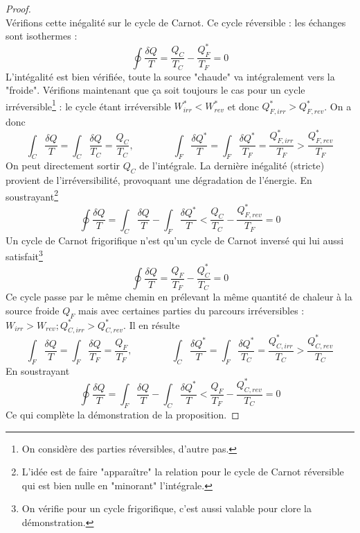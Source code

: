 	\begin{proof}\ \\
	Vérifions cette inégalité sur le cycle de Carnot. Ce cycle réversible : les 
	échanges sont isothermes :
	\begin{equation}
	\oint \dfrac{\delta Q}{T} = \dfrac{Q_C}{T_C} - \dfrac{Q_F^*}{T_F} = 0
	\end{equation}
	L'intégalité est bien vérifiée, toute la source "chaude" va intégralement vers 
	la "froide". Vérifions maintenant que ça soit toujours le 
	cas pour un cycle irréversible\footnote{On considère des parties réversibles, 
	d'autre pas.} : le cycle étant irréversible $W_{irr}^* < W_{rev}^*$ et donc 
	$Q_{F,irr}^* > Q_{F,rev}^*$. On a donc 
	\begin{equation}
	\int_C \dfrac{\delta Q}{T} = \int_C \dfrac{\delta Q}{T_C} = \dfrac{Q_C}{T_C}, 
	\qquad\qquad
	\int_F \dfrac{\delta Q^*}{T} = \int_F \dfrac{\delta Q^*}{T_F} = \dfrac{Q_{F,irr}^*}{T_F} 
	> \dfrac{Q_{F,rev}^*}{T_F} 
	\end{equation}
	On peut directement sortir $Q_C$ de l'intégrale. La dernière inégalité (stricte) 
	provient de l'irréversibilité, provoquant une dégradation de l'énergie. En 
	soustrayant\footnote{L'idée est de faire "apparaître" la relation pour le cycle 
	de Carnot réversible qui est bien nulle en "minorant" l'intégrale.}
	\begin{equation}
	\oint \dfrac{\delta Q}{T} = \int_C \dfrac{\delta Q}{T}-\int_F\dfrac{\delta Q^*}{T} 
	< \dfrac{Q_C}{T_C}-\dfrac{Q_{F,rev}^*}{T_F} = 0
	\end{equation}
	Un cycle de Carnot frigorifique n'est qu'un cycle de Carnot inversé qui lui 
	aussi satisfait\footnote{On vérifie pour un cycle frigorifique, c'est 
	aussi valable pour clore la démonstration.}
	\begin{equation}
	\oint \dfrac{\delta Q}{T} = \dfrac{Q_F}{T_F}-\dfrac{Q_C^*}{T_C} = 0
	\end{equation}
	Ce cycle passe par le même chemin en prélevant la même quantité de chaleur à la 
	source froide $Q_F$ mais avec certaines parties du parcours irréversibles : 
	$W_{irr} > W_{rev} ; Q_{C,irr}^* > Q_{C,rev}^*$. Il en résulte
	\begin{equation}
	\int_F \dfrac{\delta Q}{T} = \int_F \dfrac{\delta Q}{T_F} = \dfrac{Q_F}{T_F}, 
	\qquad\qquad
	\int_C \dfrac{\delta Q^*}{T} = \int_F \dfrac{\delta Q^*}{T_C} = \dfrac{Q_{C,irr}^*}{T_C} 
	> \dfrac{Q_{C,rev}^*}{T_C} 
	\end{equation}
	En 	soustrayant
	\begin{equation}
	\oint \dfrac{\delta Q}{T} = \int_F \dfrac{\delta Q}{T}-\int_C\dfrac{\delta Q^*}{T} 
	< \dfrac{Q_F}{T_F}-\dfrac{Q_{C,rev}^*}{T_C} = 0
	\end{equation}
	Ce qui complète la démonstration de la proposition.
	\end{proof}
	

